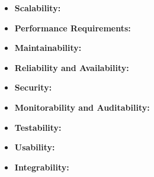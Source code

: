 
\begin{flushleft}
	\begin{itemize}
		\item \textbf{Scalability:} 
		\item \textbf{Performance Requirements:} 
		\item \textbf{Maintainability:} 
	
		\item \textbf{Reliability and Availability:} 
		\item \textbf{Security:} 
		\item \textbf{Monitorability and Auditability:} 
	
		\item \textbf{Testability:} 
		\item \textbf{Usability:} 
		\item \textbf{Integrability:} 
	\end{itemize}
	
\end{flushleft}


